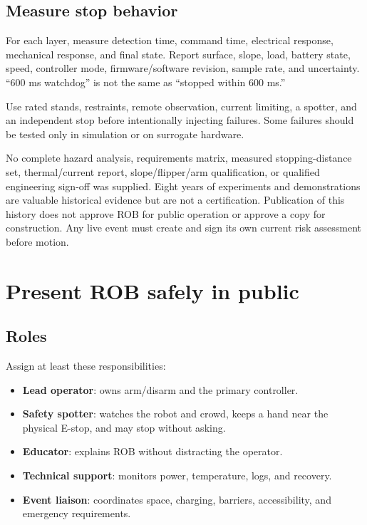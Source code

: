 \documentclass[10pt,openany]{book}
\begin{document}
\section{Measure stop behavior}

For each layer, measure detection time, command time, electrical response, mechanical response, and final state. Report surface, slope, load, battery state, speed, controller mode, firmware/software revision, sample rate, and uncertainty. ``600 ms watchdog'' is not the same as ``stopped within 600 ms.''

\begin{safetybox}
Use rated stands, restraints, remote observation, current limiting, a spotter, and an independent stop before intentionally injecting failures. Some failures should be tested only in simulation or on surrogate hardware.
\end{safetybox}

\begin{safetybox}[title={NO SAFETY CERTIFICATION}]
No complete hazard analysis, requirements matrix, measured stopping-distance set, thermal/current report, slope/flipper/arm qualification, or qualified engineering sign-off was supplied. Eight years of experiments and demonstrations are valuable historical evidence but are not a certification. Publication of this history does not approve ROB for public operation or approve a copy for construction. Any live event must create and sign its own current risk assessment before motion.
\end{safetybox}


\chapter{Present ROB safely in public}

\section{Roles}

Assign at least these responsibilities:

\begin{itemize}
  \item \textbf{Lead operator}: owns arm/disarm and the primary controller.
  \item \textbf{Safety spotter}: watches the robot and crowd, keeps a hand near the physical E-stop, and may stop without asking.
  \item \textbf{Educator}: explains ROB without distracting the operator.
  \item \textbf{Technical support}: monitors power, temperature, logs, and recovery.
  \item \textbf{Event liaison}: coordinates space, charging, barriers, accessibility, and emergency requirements.
\end{itemize}
\end{document}
